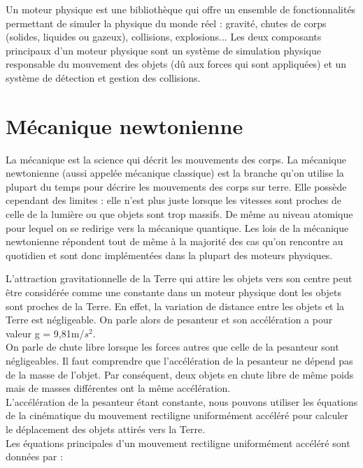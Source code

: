 \documentclass{report}
\begin{document}
Un moteur physique est une bibliothèque qui offre un ensemble de fonctionnalités permettant de simuler la physique du monde réel : gravité, chutes de corps (solides, liquides ou gazeux), collisions, explosions... Les deux composants principaux d’un moteur physique sont un système de simulation physique responsable du mouvement des objets (dû aux forces qui sont appliquées) et un système de détection et gestion des collisions.

\section{Mécanique newtonienne}


La mécanique est la science qui décrit les mouvements des corps. La mécanique newtonienne (aussi appelée mécanique classique) est la branche qu'on utilise la plupart du temps pour décrire les mouvements des corps sur terre. Elle possède cependant des limites : elle n'est plus juste lorsque les vitesses sont proches de celle de la lumière ou que objets sont trop massifs. De même au niveau atomique pour lequel on se redirige vers la mécanique quantique. Les lois de la mécanique newtonienne répondent tout de même à la majorité des cas qu'on rencontre au quotidien et sont donc implémentées dans la plupart des moteurs physiques.

L’attraction gravitationnelle de la Terre qui attire les objets vers son centre peut être considérée comme une constante dans un moteur physique dont les objets sont proches de la Terre. En effet, la variation de distance entre les objets et la Terre est négligeable. On parle alors de pesanteur et son accélération a pour valeur g = 9,81m/$s^2$. \\

On parle de chute libre lorsque les forces autres que celle de la pesanteur sont négligeables. Il faut comprendre que l'accélération de la pesanteur ne dépend pas de la masse de l'objet. Par conséquent, deux objets en chute libre de même poids mais de masses différentes ont la même accélération. \\

L’accélération de la pesanteur étant constante, nous pouvons utiliser les équations de la cinématique du mouvement rectiligne uniformément accéléré  pour calculer le déplacement des objets attirés vers la Terre. \\

\newpage
Les équations principales d’un mouvement rectiligne uniformément accéléré \cite{02} sont données par :
\end{document}
